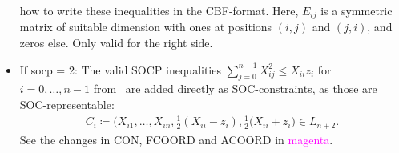 \documentclass[11pt,a4paper]{article}
\newcommand{\define}{\coloneqq}
\theoremstyle{definition}
\begin{document}
\begin{itemize}
  how to write these inequalities in the CBF-format. Here, $E_{ij}$ is a
  symmetric matrix of suitable dimension with ones at positions $(i,j)$ and
  $(j,i)$, and zeros else. Only valid for the right side.
\item If socp = 2: The valid SOCP inequalities
  $\sum_{j=0}^{n-1}X_{ij}^2 \leq X_{ii}z_i$ for $i = 0,\dots,n-1$
  from~\cite{LiX20} are added directly as SOC-constraints, as those are
  SOC-representable:
  \begin{align*}
    C_i \define \big(X_{i1}, \dots, X_{in}, \tfrac{1}{2}(X_{ii}-z_i),
    \tfrac{1}{2}(X_{ii}+z_i \big) \in L_{n+2}.
  \end{align*}
  See the changes in CON, FCOORD and ACOORD in
  \textcolor{magenta}{magenta}.
\end{itemize}

\begin{small}
  
  
\end{small}
\end{document}
